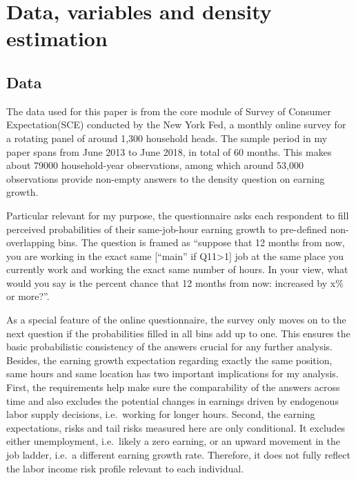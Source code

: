 \documentclass[12pt,notitlepage,onecolumn,aps,pra]{revtex4-1}
\begin{document}
    \hypertarget{data-variables-and-density-estimation}{%
\section{Data, variables and density
estimation}\label{data-variables-and-density-estimation}}

\hypertarget{data}{%
\subsection{Data}\label{data}}

The data used for this paper is from the core module of Survey of
Consumer Expectation(SCE) conducted by the New York Fed, a monthly
online survey for a rotating panel of around 1,300 household heads. The
sample period in my paper spans from June 2013 to June 2018, in total of
60 months. This makes about 79000 household-year observations, among
which around 53,000 observations provide non-empty answers to the
density question on earning growth.

Particular relevant for my purpose, the questionnaire asks each
respondent to fill perceived probabilities of their same-job-hour
earning growth to pre-defined non-overlapping bins. The question is
framed as ``suppose that 12 months from now, you are working in the
exact same {[}``main'' if Q11\textgreater{}1{]} job at the same place
you currently work and working the exact same number of hours. In your
view, what would you say is the percent chance that 12 months from now:
increased by x\% or more?''.

As a special feature of the online questionnaire, the survey only moves
on to the next question if the probabilities filled in all bins add up
to one. This ensures the basic probabilistic consistency of the answers
crucial for any further analysis. Besides, the earning growth
expectation regarding exactly the same position, same hours and same
location has two important implications for my analysis. First, the
requirements help make sure the comparability of the answers across time
and also excludes the potential changes in earnings driven by endogenous
labor supply decisions, i.e.~working for longer hours. Second, the
earning expectations, risks and tail risks measured here are only
conditional. It excludes either unemployment, i.e.~likely a zero
earning, or an upward movement in the job ladder, i.e.~a different
earning growth rate. Therefore, it does not fully reflect the labor
income risk profile relevant to each individual.
\end{document}
